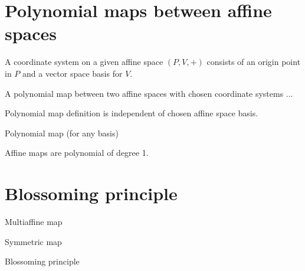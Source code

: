 %

\section{Polynomial maps between affine spaces}
\begin{definition}
	\label{def:CoordinateSystem}
	\leanok	
	A coordinate system on a given affine space $(P,V,+)$ consists of an origin point in $P$ and a vector space basis for $V$.
\end{definition}

\begin{definition}
	\label{def:PolynomialMapInCoords}
	A polynomial map between two affine spaces with chosen coordinate systems ...
\end{definition}

\begin{theorem}
    Polynomial map definition is independent of chosen affine space basis.
\end{theorem}
\begin{definition}
    Polynomial map (for any basis)
\end{definition}

\begin{theorem}
    Affine maps are polynomial of degree 1.
\end{theorem}

\section{Blossoming principle}
\begin{definition}
    Multiaffine map
\end{definition}
\begin{definition}
    Symmetric map
\end{definition}
\begin{theorem}
    Blossoming principle
\end{theorem}
